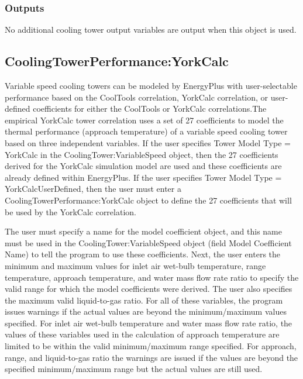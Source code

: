 \subsubsection{Outputs}\label{outputs-4-001}

No additional cooling tower output variables are output when this object is used.

\subsection{CoolingTowerPerformance:YorkCalc}\label{coolingtowerperformanceyorkcalc}

Variable speed cooling towers can be modeled by EnergyPlus with user-selectable performance based on the CoolTools correlation, YorkCalc correlation, or user-defined coefficients for either the CoolTools or YorkCalc correlations.The empirical YorkCalc tower correlation uses a set of 27 coefficients to model the thermal performance (approach temperature) of a variable speed cooling tower based on three independent variables. If the user specifies Tower Model Type = YorkCalc in the CoolingTower:VariableSpeed object, then the 27 coefficients derived for the YorkCalc simulation model are used and these coefficients are already defined within EnergyPlus. If the user specifies Tower Model Type = YorkCalcUserDefined, then the user must enter a CoolingTowerPerformance:YorkCalc object to define the 27 coefficients that will be used by the YorkCalc correlation.

The user must specify a name for the model coefficient object, and this name must be used in the CoolingTower:VariableSpeed object (field Model Coefficient Name) to tell the program to use these coefficients. Next, the user enters the minimum and maximum values for inlet air wet-bulb temperature, range temperature, approach temperature, and water mass flow rate ratio to specify the valid range for which the model coefficients were derived. The user also specifies the maximum valid liquid-to-gas ratio. For all of these variables, the program issues warnings if the actual values are beyond the minimum/maximum values specified. For inlet air wet-bulb temperature and water mass flow rate ratio, the values of these variables used in the calculation of approach temperature are limited to be within the valid minimum/maximum range specified. For approach, range, and liquid-to-gas ratio the warnings are issued if the values are beyond the specified minimum/maximum range but the actual values are still used.

